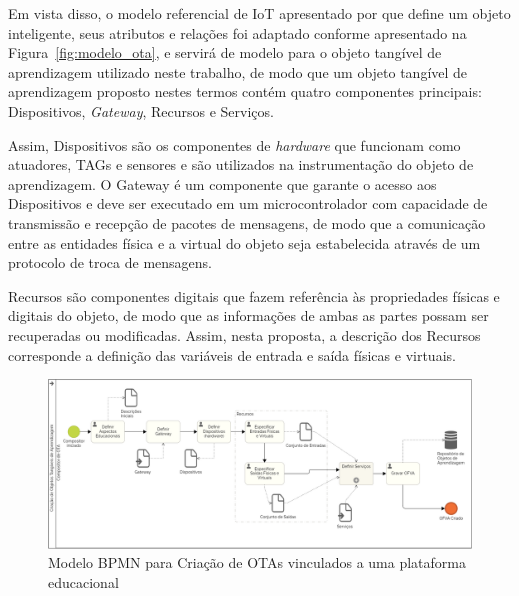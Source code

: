 Em vista disso, o modelo referencial de IoT apresentado por \cite{serbanati:2011} que define um objeto inteligente, seus atributos e relações foi adaptado conforme apresentado na Figura~\ref{fig:modelo_ota}, e servirá de modelo para o objeto tangível de aprendizagem utilizado neste trabalho, de modo que um objeto tangível de aprendizagem proposto nestes termos contém quatro componentes principais: Dispositivos, \textit{Gateway}, Recursos e Serviços. 

Assim, Dispositivos são os componentes de \textit{hardware} que funcionam como atuadores, TAGs e sensores e são utilizados na instrumentação do objeto de aprendizagem. O Gateway é um componente que garante o acesso aos Dispositivos e deve ser executado em um microcontrolador com capacidade de transmissão e recepção de pacotes de mensagens, de modo que a comunicação entre as entidades física e a virtual do objeto seja estabelecida através de um protocolo de troca de mensagens.

Recursos são componentes digitais que fazem referência às propriedades físicas e digitais do objeto, de modo que as informações de ambas as partes possam ser recuperadas ou modificadas. Assim, nesta proposta, a descrição dos Recursos corresponde a definição das variáveis de entrada e saída físicas e virtuais.

\begin{figure}[htb]
	\centering
	\includegraphics[width=1\linewidth]{chapters/proposedMethod/bpmn_ofva.png}
	\caption{Modelo BPMN para Criação de OTAs vinculados a uma plataforma educacional}
	\label{fig:bpmn_ofva}
\end{figure}


